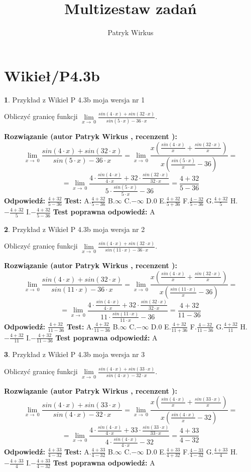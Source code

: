 \documentclass[12pt, a4paper]{article}
\title{Multizestaw zadań}
\author{Patryk Wirkus}
\date{}
\theoremstyle{definition} %
\newtheorem{zad}{}
\newcommand{\kategoria}[1]{\section{#1}}
\newcommand{\zadStart}[1]{\begin{zad}#1\newline}
\newcommand{\zadStop}{\end{zad}}
\newcommand{\rozwStart}[2]{\noindent \textbf{Rozwiązanie (autor #1 , recenzent #2): }\newline}
\newcommand{\rozwStop}{\newline}
\newcommand{\odpStart}{\noindent \textbf{Odpowiedź:}\newline}
\newcommand{\odpStop}{\newline}
\newcommand{\testStart}{\noindent \textbf{Test:}\newline}
\newcommand{\testStop}{\newline}
\newcommand{\kluczStart}{\noindent \textbf{Test poprawna odpowiedź:}\newline}
\newcommand{\kluczStop}{\newline}
\begin{document}
\maketitle

\kategoria{Wikieł/P4.3b}


\zadStart{Przykład z Wikieł P 4.3b moja wersja nr 1}


Obliczyć granicę funkcji $\lim\limits_{x\to\ 0}\frac{sin(4 \cdot x)+sin(32 \cdot x)}{sin(5 \cdot x)-36 \cdot x}$.
\zadStop
\rozwStart{Patryk Wirkus}{}
$$\lim\limits_{x\to\ 0}\frac{sin(4 \cdot x)+sin(32 \cdot x)}{sin(5 \cdot x)-36 \cdot x}=\lim\limits_{x\to\ 0}\frac{x(\frac{sin(4 \cdot x)}{x}+\frac{sin(32 \cdot x)}{x})}{x(\frac{sin(5 \cdot x)}{x}-36)}=$$
$$=\lim\limits_{x\to\ 0}\frac{4 \cdot \frac{sin(4 \cdot x)}{4 \cdot x}+32 \cdot \frac{sin(32 \cdot x)}{32 \cdot x}}{5 \cdot \frac{sin(5 \cdot x)}{5 \cdot x}-36}=\frac{4+32}{5-36}$$
\rozwStop
\odpStart
$\frac{4+32}{5-36}$
\odpStop
\testStart
A.$\frac{4+32}{5-36}$
B.$\infty$
C.$-\infty$
D.$0$
E.$\frac{4+32}{5+36}$
F.$\frac{4-32}{5-36}$
G.$\frac{4+32}{5}$
H.$-\frac{4+32}{5}$
I.$-\frac{4+32}{5-36}$
\testStop
\kluczStart
A
\kluczStop



\zadStart{Przykład z Wikieł P 4.3b moja wersja nr 2}


Obliczyć granicę funkcji $\lim\limits_{x\to\ 0}\frac{sin(4 \cdot x)+sin(32 \cdot x)}{sin(11 \cdot x)-36 \cdot x}$.
\zadStop
\rozwStart{Patryk Wirkus}{}
$$\lim\limits_{x\to\ 0}\frac{sin(4 \cdot x)+sin(32 \cdot x)}{sin(11 \cdot x)-36 \cdot x}=\lim\limits_{x\to\ 0}\frac{x(\frac{sin(4 \cdot x)}{x}+\frac{sin(32 \cdot x)}{x})}{x(\frac{sin(11 \cdot x)}{x}-36)}=$$
$$=\lim\limits_{x\to\ 0}\frac{4 \cdot \frac{sin(4 \cdot x)}{4 \cdot x}+32 \cdot \frac{sin(32 \cdot x)}{32 \cdot x}}{11 \cdot \frac{sin(11 \cdot x)}{11 \cdot x}-36}=\frac{4+32}{11-36}$$
\rozwStop
\odpStart
$\frac{4+32}{11-36}$
\odpStop
\testStart
A.$\frac{4+32}{11-36}$
B.$\infty$
C.$-\infty$
D.$0$
E.$\frac{4+32}{11+36}$
F.$\frac{4-32}{11-36}$
G.$\frac{4+32}{11}$
H.$-\frac{4+32}{11}$
I.$-\frac{4+32}{11-36}$
\testStop
\kluczStart
A
\kluczStop



\zadStart{Przykład z Wikieł P 4.3b moja wersja nr 3}


Obliczyć granicę funkcji $\lim\limits_{x\to\ 0}\frac{sin(4 \cdot x)+sin(33 \cdot x)}{sin(4 \cdot x)-32 \cdot x}$.
\zadStop
\rozwStart{Patryk Wirkus}{}
$$\lim\limits_{x\to\ 0}\frac{sin(4 \cdot x)+sin(33 \cdot x)}{sin(4 \cdot x)-32 \cdot x}=\lim\limits_{x\to\ 0}\frac{x(\frac{sin(4 \cdot x)}{x}+\frac{sin(33 \cdot x)}{x})}{x(\frac{sin(4 \cdot x)}{x}-32)}=$$
$$=\lim\limits_{x\to\ 0}\frac{4 \cdot \frac{sin(4 \cdot x)}{4 \cdot x}+33 \cdot \frac{sin(33 \cdot x)}{33 \cdot x}}{4 \cdot \frac{sin(4 \cdot x)}{4 \cdot x}-32}=\frac{4+33}{4-32}$$
\rozwStop
\odpStart
$\frac{4+33}{4-32}$
\odpStop
\testStart
A.$\frac{4+33}{4-32}$
B.$\infty$
C.$-\infty$
D.$0$
E.$\frac{4+33}{4+32}$
F.$\frac{4-33}{4-32}$
G.$\frac{4+33}{4}$
H.$-\frac{4+33}{4}$
I.$-\frac{4+33}{4-32}$
\testStop
\kluczStart
A
\kluczStop
\end{document}
